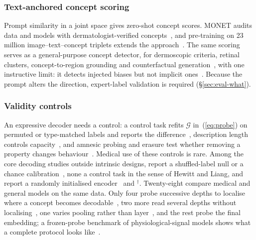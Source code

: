\subsubsection{Text-anchored concept scoring}

Prompt similarity in a joint space gives zero-shot concept scores. MONET audits data and models with
dermatologist-verified concepts~\cite{kim2024transparent}, and pre-training on 23 million
image--text--concept triplets extends the approach~\cite{nie2025explainable}. The same scoring serves as
a general-purpose concept detector, for dermoscopic criteria, retinal clusters, concept-to-region
grounding and counterfactual
generation~\cite{patricio2023conceptbased,mensah2026interpretable,luo2025xbench,sadashivaiah2024explaining},
with one instructive limit: it detects injected biases but not implicit
ones~\cite{bertolini2025strengths}. Because the prompt alters the direction, expert-label validation is
required (\S\ref{sec:eval-what}).

\subsubsection{Validity controls}

An expressive decoder needs a control: a control task refits $\mathcal G$ in~(\ref{eq:probe}) on
permuted or type-matched labels and reports the difference~\cite{hewitt2019designing}, description
length controls capacity~\cite{voita2020information}, and amnesic probing and erasure test whether
removing a property changes
behaviour~\cite{elazar2020amnesic,ravfogel2020null,belrose2023leace,pimentel2020informationtheoretic,guerner2023geometric}.
Medical use of these controls is rare. Among the \Ndecni{} core decoding studies outside intrinsic
designs, \Nprobectrl{} report a shuffled-label null or a chance
calibration~\cite{liang2026cheap,rahbar2026frozen,vig2026do,bertolini2025strengths,arasteh2026candor,steiner2026when,li2026acquisition,cajas2026shortkit},
none a control task in the sense of Hewitt and Liang, and \Nproberand{} report a randomly initialised
encoder~\cite{rahbar2026frozen,arasteh2026candor,svatko2026deep,farquhar2026pretraining} and
\cite{tariq2024self}$^{\dagger}$. Twenty-eight compare medical and general models on the same data.
Only four probe successive depths to localise where a concept becomes
decodable~\cite{pedersen2026look,rahbar2026frozen,vig2026do,vadori2025mind}, two more read several
depths without localising~\cite{farquhar2026pretraining,demir2025downstream}, one varies pooling rather
than layer~\cite{muthyala2026frozen}, and the rest probe the final embedding; a frozen-probe benchmark
of physiological-signal models shows what a complete protocol looks like~\cite{zare2026eeg}.


